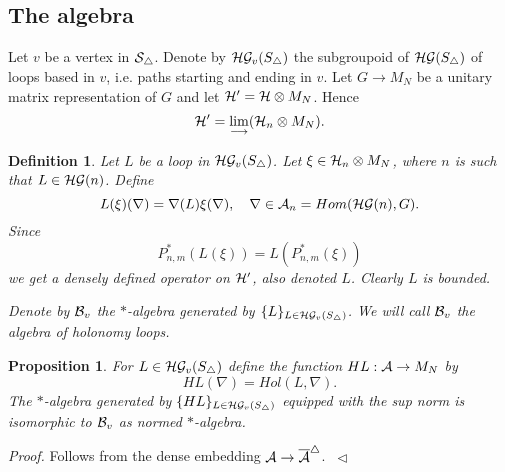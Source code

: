 \documentclass[12pt]{article}
\newcommand{\eproof}{{~\hfill$ \triangleleft$}}
\def\ca{{\cal A}}
\def\cb{{\cal B}}
\def\cg{{\cal G}}
\def\ch{{\cal H}}
\def\cs{{\cal S}}
\newtheorem{definition}[thm]{Definition}
\newtheorem{proposition}[thm]{Proposition}
\begin{document}
{\subsection{The algebra}
Let $v$ be a vertex in $\cs_\triangle$. Denote by $\ch\cg_v(S_\triangle )$ the subgroupoid of $\ch\cg (S_\triangle )$ of loops based in $v$, i.e. paths starting and ending in $v$. Let $G\to M_N$ be a unitary matrix representation of $G$ and let $\ch'=\ch \otimes M_N$. Hence 
$$\ch'= \lim_{\longrightarrow} (\ch_n \otimes M_N).$$
\begin{definition}\label{holalg}
Let $L$ be a loop in $\ch\cg_v(S_\triangle )$. Let $\xi \in \ch_n\otimes M_N$, where $n$ is such that $L\in \ch\cg (n )$. Define 
$$L( \xi )(\nabla )=\nabla (L) \xi (\nabla), \quad \nabla \in \ca_{n}=Hom(\ch \cg ( n),G).$$
Since 
$$P^*_{n,m}(L(\xi))=L(P^*_{n,m}(\xi))$$ 
we get a densely defined operator on $\ch'$, also denoted $L$. Clearly $L$ is bounded.

Denote by $\cb_v$ the $*$-algebra generated by $\{ L\}_{L\in  \ch\cg_v(S_\triangle )}$. 
We will call $\cb_v$  the algebra of holonomy loops.
\end{definition}


\begin{proposition}
For $L\in  \ch\cg_v(S_\triangle )$ define the function
$HL:\ca\to M_N $ by
$$HL(\nabla )=Hol(L,\nabla).$$
The $*$-algebra generated by $\{HL\}_{L\in  \ch\cg_v(S_\triangle )}$ equipped with the sup norm is isomorphic to $\cb_v$ as normed $*$-algebra. 
\end{proposition}

\textit{Proof.} Follows from the dense embedding $\ca\to \overline{\ca}^\triangle$. \eproof

}
\end{document}
